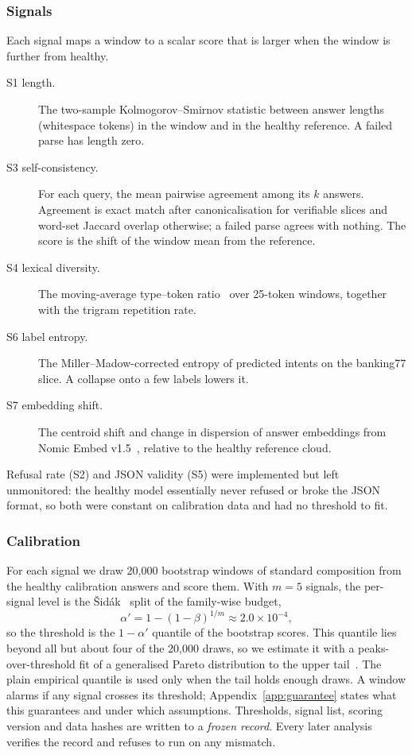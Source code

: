 \documentclass[11pt]{article}
\begin{document}
\subsubsection{Signals}
Each signal maps a window to a scalar score that is larger when the window is
further from healthy.
\begin{description}
  \item[S1 length.] The two-sample Kolmogorov--Smirnov statistic between answer
  lengths (whitespace tokens) in the window and in the healthy reference. A failed
  parse has length zero.
  \item[S3 self-consistency.] For each query, the mean pairwise agreement among
  its $k$ answers. Agreement is exact match after canonicalisation for verifiable
  slices and word-set Jaccard overlap otherwise; a failed parse agrees with
  nothing. The score is the shift of the window mean from the reference.
  \item[S4 lexical diversity.] The moving-average type--token
  ratio~\citep{covington2010mattr} over 25-token windows, together with the
  trigram repetition rate.
  \item[S6 label entropy.] The Miller--Madow-corrected entropy of predicted
  intents on the banking77 slice. A collapse onto a few labels lowers it.
  \item[S7 embedding shift.] The centroid shift and change in dispersion of
  answer embeddings from Nomic Embed v1.5~\citep{nussbaum2024nomic},
  relative to the healthy reference cloud.
\end{description}
Refusal rate (S2) and JSON validity (S5) were implemented but left unmonitored:
the healthy model essentially never refused or broke the JSON format, so both
were constant on calibration data and had no threshold to fit.

\subsubsection{Calibration}
For each signal we draw 20{,}000 bootstrap windows of standard composition from
the healthy calibration answers and score them. With $m=5$ signals, the per-signal
level is the Šidák~\citep{sidak1967rectangular} split of the family-wise budget,
\[
  \alpha' = 1-(1-\beta)^{1/m} \approx 2.0\times10^{-4},
\]
so the threshold is the $1-\alpha'$ quantile of the bootstrap scores. This quantile
lies beyond all but about four of the 20{,}000 draws, so we estimate it with a
peaks-over-threshold fit of a generalised Pareto distribution to the upper
tail~\citep{pickands1975statistical}. The plain empirical quantile is used only
when the tail holds enough draws. A window alarms if any signal crosses its
threshold; Appendix~\ref{app:guarantee} states what this guarantees and under which
assumptions. Thresholds, signal list, scoring version and data hashes are written to
a \emph{frozen record}. Every later analysis verifies the record and refuses to run
on any mismatch.
\end{document}

